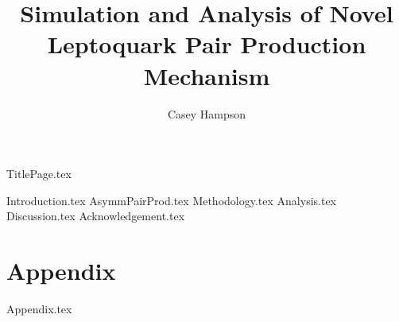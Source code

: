 \documentclass[titlepage]{article}
\title{Simulation and Analysis of Novel Leptoquark Pair Production Mechanism}
\author{Casey Hampson}
\begin{document}
    {TitlePage.tex}
    \pagebreak
    \tableofcontents
    \pagebreak

    
    {Introduction.tex}
    {AsymmPairProd.tex}
    {Methodology.tex}
    {Analysis.tex}
    {Discussion.tex}
    {Acknowledgement.tex}


    \pagebreak
    \part*{Appendix}
    \appendix
    {Appendix.tex}

    \pagebreak
    
    
    
\end{document}
